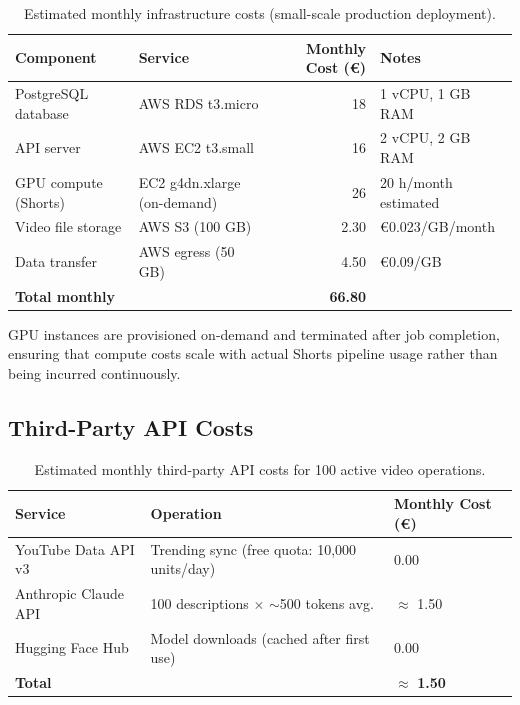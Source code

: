 \documentclass[ENG]{TFUOC}
\begin{document}
\begin{table}[H]
\centering
\caption{Estimated monthly infrastructure costs (small-scale production deployment).}
\label{tab:infra_costs}
\begin{tabular}{@{}llrl@{}}
\toprule
\textbf{Component} & \textbf{Service} & \textbf{Monthly Cost (€)} & \textbf{Notes} \\
\midrule
PostgreSQL database      & AWS RDS t3.micro        & 18    & 1 vCPU, 1 GB RAM \\
API server               & AWS EC2 t3.small        & 16    & 2 vCPU, 2 GB RAM \\
GPU compute (Shorts)     & EC2 g4dn.xlarge (on-demand) & 26 & 20 h/month estimated \\
Video file storage       & AWS S3 (100 GB)         & 2.30  & €0.023/GB/month \\
Data transfer            & AWS egress (50 GB)      & 4.50  & €0.09/GB \\
\midrule
\textbf{Total monthly}   &                         & \textbf{66.80} & \\
\bottomrule
\end{tabular}
\end{table}

GPU instances are provisioned on-demand and terminated after job completion, ensuring that compute costs scale with actual Shorts pipeline usage rather than being incurred continuously.

\subsection{Third-Party API Costs}

\begin{table}[H]
\centering
\caption{Estimated monthly third-party API costs for 100 active video operations.}
\label{tab:api_costs}
\begin{tabular}{@{}lll@{}}
\toprule
\textbf{Service} & \textbf{Operation} & \textbf{Monthly Cost (€)} \\
\midrule
YouTube Data API v3  & Trending sync (free quota: 10,000 units/day) & 0.00 \\
Anthropic Claude API & 100 descriptions $\times$ $\sim$500 tokens avg. & $\approx$ 1.50 \\
Hugging Face Hub     & Model downloads (cached after first use)      & 0.00 \\
\midrule
\textbf{Total}       &                                               & $\approx$ \textbf{1.50} \\
\bottomrule
\end{tabular}
\end{table}
\end{document}
